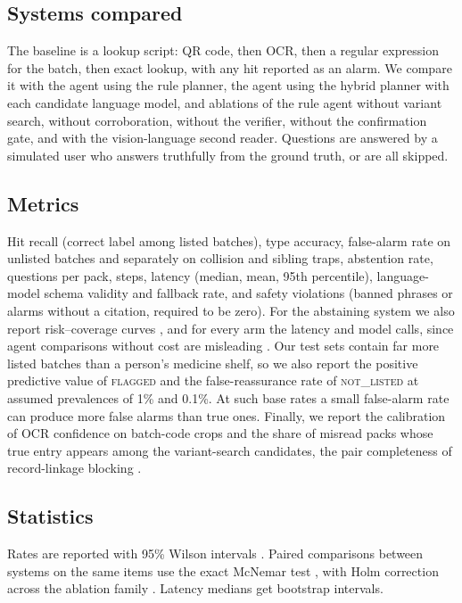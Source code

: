 \subsection{Systems compared}
The baseline is a lookup script: QR code, then OCR, then a regular expression for the batch, then exact lookup, with any hit reported as an alarm. We compare it with the agent using the rule planner, the agent using the hybrid planner with each candidate language model, and ablations of the rule agent without variant search, without corroboration, without the verifier, without the confirmation gate, and with the vision-language second reader. Questions are answered by a simulated user who answers truthfully from the ground truth, or are all skipped.

\subsection{Metrics}
Hit recall (correct label among listed batches), type accuracy, false-alarm rate on unlisted batches and separately on collision and sibling traps, abstention rate, questions per pack, steps, latency (median, mean, 95th percentile), language-model schema validity and fallback rate, and safety violations (banned phrases or alarms without a citation, required to be zero). For the abstaining system we also report risk--coverage curves \cite{geifman2017selective}, and for every arm the latency and model calls, since agent comparisons without cost are misleading \cite{kapoor2024agents}. Our test sets contain far more listed batches than a person's medicine shelf, so we also report the positive predictive value of \textsc{flagged} and the false-reassurance rate of \textsc{not\_listed} at assumed prevalences of 1\% and 0.1\%. At such base rates a small false-alarm rate can produce more false alarms than true ones. Finally, we report the calibration of OCR confidence on batch-code crops \cite{guo2017calibration} and the share of misread packs whose true entry appears among the variant-search candidates, the pair completeness of record-linkage blocking \cite{papadakis2020survey}.

\subsection{Statistics}
Rates are reported with 95\% Wilson intervals \cite{wilson1927probable,brown2001interval}. Paired comparisons between systems on the same items use the exact McNemar test \cite{mcnemar1947note,dietterich1998approximate}, with Holm correction across the ablation family \cite{holm1979simple}. Latency medians get bootstrap intervals.

